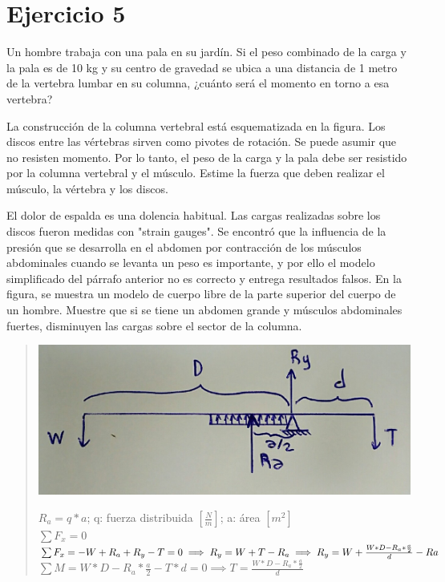 \documentclass[a4paper,12pt,twoside,final,spanish]{article}
\begin{document}
\section{Ejercicio 5}

Un hombre trabaja con una pala en su jardín. Si el peso combinado de la carga y la pala es de 10 kg y su centro de gravedad se ubica a una distancia de 1 metro de la vertebra lumbar en su columna, ¿cuánto será el momento en torno a esa vertebra?

La construcción de la columna vertebral está esquematizada en la figura. Los discos entre las vértebras sirven como pivotes de rotación. Se puede asumir que no resisten momento. Por lo tanto, el peso de la carga y la pala debe ser resistido por la columna vertebral y el músculo. Estime la fuerza que deben realizar el músculo, la vértebra y los discos.

El dolor de espalda es una dolencia habitual. Las cargas realizadas sobre los discos fueron medidas con "strain gauges". Se encontró que la influencia de la presión que se desarrolla en el abdomen por contracción de los músculos abdominales cuando se levanta un peso es importante, y por ello el modelo simplificado del párrafo anterior no es correcto y entrega resultados falsos. En la figura, se muestra un modelo de cuerpo libre de la parte superior del cuerpo de un hombre. Muestre que si se tiene un abdomen grande y músculos abdominales fuertes, disminuyen las cargas sobre el sector de la columna. 

\dotfill

\begin{quote}

\begin{center}
\includegraphics[width=0.9\linewidth,keepaspectratio]{ejercicio5}
\end{center}

$R_{a}=q*a$; q: fuerza distribuida $[\frac{N}{m}]$; a: área $[m^2]$ \\
$\sum F_{x}=0$\\
$\sum F_{x}=-W+R_{a}+R_{y}-T=0 \implies R_{y}=W+T-R_{a}\\ \implies R_{y}=W+\frac{W*D-R_{a}*\frac{a}{2}}{d}-Ra$\\
$\sum M=W*D-R_{a}*\frac{a}{2}-T*d=0 \implies T=\frac{W*D-R_{a}*\frac{a}{2}}{d}$
\end{quote}
\end{document}

